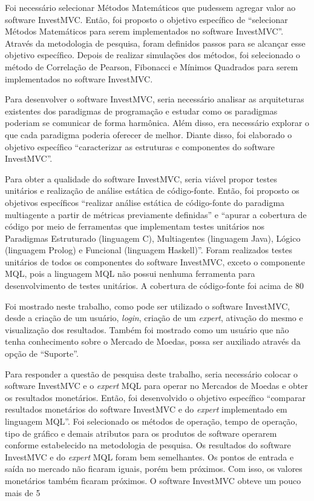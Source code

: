Foi necessário selecionar Métodos Matemáticos que pudessem agregar valor ao software InvestMVC. Então, foi proposto o objetivo específico de “selecionar Métodos Matemáticos para serem implementados no software InvestMVC”. Através da metodologia de pesquisa, foram definidos passos para se alcançar esse objetivo específico. Depois de realizar simulações dos métodos, foi selecionado o método de Correlação de Pearson, Fibonacci e Mínimos Quadrados para serem implementados no software InvestMVC.

Para desenvolver o software InvestMVC, seria necessário analisar as arquiteturas existentes dos paradigmas de programação e estudar como os paradigmas poderiam se comunicar de forma harmônica. Além disso, era necessário explorar o que cada paradigma poderia oferecer de melhor. Diante disso, foi elaborado o objetivo específico “caracterizar as estruturas e componentes do software InvestMVC”.

Para obter a qualidade do software InvestMVC, seria viável propor testes unitários e realização de análise estática de código-fonte. Então, foi proposto os objetivos específicos “realizar análise estática de código-fonte do paradigma multiagente a partir de métricas previamente definidas” e “apurar a cobertura de código por meio de ferramentas que implementam testes unitários nos Paradigmas Estruturado (linguagem C), Multiagentes (linguagem Java), Lógico (linguagem Prolog) e Funcional (linguagem Haskell)”. Foram realizados testes unitários de todos os componentes do software InvestMVC, exceto o componente MQL, pois a linguagem MQL não possui nenhuma ferramenta para desenvolvimento de testes unitários. A cobertura de código-fonte foi acima de 80%

Foi mostrado neste trabalho, como pode ser utilizado o software InvestMVC, desde a criação de um usuário, \textit{login}, criação de um \textit{expert}, ativação do mesmo e visualização dos resultados. Também foi mostrado como um usuário que não tenha conhecimento sobre o Mercado de Moedas, possa ser auxiliado através da opção de “Suporte”. 

Para responder a questão de pesquisa deste trabalho, seria necessário colocar o software InvestMVC e o \textit{expert} MQL para operar no Mercados de Moedas e obter os resultados monetários. Então, foi desenvolvido o objetivo específico “comparar resultados monetários do software InvestMVC e do \textit{expert} implementado em linguagem MQL”. Foi selecionado os métodos de operação, tempo de operação, tipo de gráfico e demais atributos para os produtos de software operarem conforme estabelecido na metodologia de pesquisa. Os resultados do software InvestMVC e do \textit{expert} MQL foram bem semelhantes. Os pontos de entrada e saída no mercado não ficaram iguais, porém bem próximos. Com isso, os valores monetários também ficaram próximos. O software InvestMVC obteve um pouco mais de 5%

